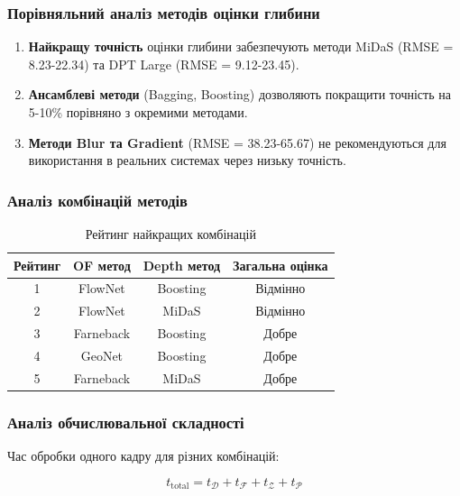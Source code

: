 \documentclass[14pt, a4paper]{extarticle}
\numberwithin{equation}{section}
\begin{document}
\subsubsection{Порівняльний аналіз методів оцінки глибини}

\begin{enumerate}
    \item \textbf{Найкращу точність} оцінки глибини забезпечують методи MiDaS (RMSE = 8.23-22.34) та DPT Large (RMSE = 9.12-23.45).
    
    \item \textbf{Ансамблеві методи} (Bagging, Boosting) дозволяють покращити точність на 5-10\% порівняно з окремими методами.
    
    \item \textbf{Методи Blur та Gradient} (RMSE = 38.23-65.67) не рекомендуються для використання в реальних системах через низьку точність.
\end{enumerate}

\subsubsection{Аналіз комбінацій методів}

\begin{table}[H]
\centering
\caption{Рейтинг найкращих комбінацій}
\begin{tabular}{|c|c|c|c|}
\hline
\textbf{Рейтинг} & \textbf{OF метод} & \textbf{Depth метод} & \textbf{Загальна оцінка} \\
\hline
1 & FlowNet & Boosting & Відмінно \\
2 & FlowNet & MiDaS & Відмінно \\
3 & Farneback & Boosting & Добре \\
4 & GeoNet & Boosting & Добре \\
5 & Farneback & MiDaS & Добре \\
\hline
\end{tabular}
\label{tab:rating}
\end{table}

\subsubsection{Аналіз обчислювальної складності}

Час обробки одного кадру для різних комбінацій:

\begin{equation}
t_{\text{total}} = t_{\mathcal{D}} + t_{\mathcal{F}} + t_{\mathcal{Z}} + t_{\mathcal{P}} \tag{4.32}
\end{equation}
\end{document}
